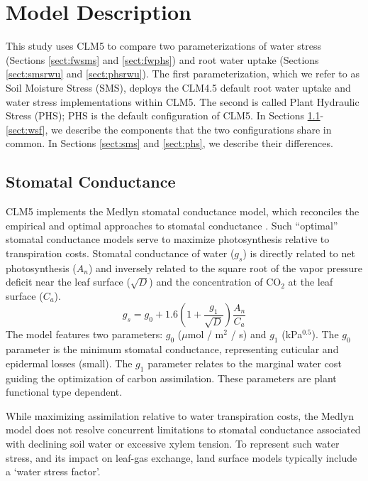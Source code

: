 \documentclass[draft,linenumbers]{agujournal}
\begin{document}
\section{Model Description}
This study uses CLM5 to compare two parameterizations of water stress (Sections \ref{sect:fwsms} and \ref{sect:fwphs}) and root water uptake (Sections \ref{sect:smsrwu} and \ref{sect:phsrwu}). The first parameterization, which we refer to as Soil Moisture Stress (SMS), deploys the CLM4.5 default root water uptake and water stress implementations within CLM5. The second is called Plant Hydraulic Stress (PHS); PHS is the default configuration of CLM5. In Sections \ref{sect:gs}-\ref{sect:wsf}, we describe the components that the two configurations share in common. In Sections \ref{sect:sms} and \ref{sect:phs}, we describe their differences.
    
    
\subsection{Stomatal Conductance}
\label{sect:gs}
    CLM5 implements the Medlyn stomatal conductance model, which reconciles the empirical and optimal approaches to 
    stomatal conductance \citep{medlyn2011}.
    Such ``optimal'' stomatal conductance models serve to maximize photosynthesis relative to transpiration costs. 
    Stomatal conductance of water ($g_s$) is directly related to net photosynthesis ($A_n$) 
    and inversely related to the square root of the vapor pressure deficit near the leaf surface ($\sqrt{D}$) and the concentration of CO$_2$ at the leaf surface ($C_a$).
    \begin{equation}
    g_s=g_0+1.6\left(1+\dfrac{g_1}{\sqrt{D}}\right)\dfrac{A_n}{C_a}
    \end{equation}
    The model features two parameters: $g_0$ ($\mu$mol / m$^2$ / s) and $g_1$ (kPa$^{0.5}$). 
    The $g_0$ parameter is the minimum stomatal conductance, representing cuticular and epidermal losses (small). 
    The $g_1$ parameter relates to the marginal water cost guiding the optimization of carbon assimilation. 
    These parameters are plant functional type dependent.
    
    While maximizing assimilation relative to water transpiration costs, the Medlyn model does not 
    resolve concurrent limitations to stomatal conductance associated with declining soil water or excessive xylem tension. 
    To represent such water stress, and its impact on leaf-gas exchange, land surface models typically include a `water stress factor'. 
\end{document}
